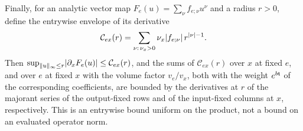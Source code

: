 \begin{lemma}
Finally, for an analytic vector map $F_e(u)=\sum_\nu f_{e;\nu}u^\nu$ and a radius $r>0$, define the entrywise envelope of its derivative
\begin{equation}\label{ch10:eq:derivative-envelope}
 \mathcal C_{ex}(r)=\sum_{\nu:\,\nu_x>0}\nu_x\lvert f_{e;\nu}\rvert\,r^{\lvert \nu\rvert-1}.
\end{equation}
Then $\sup_{\lVert u\rVert_\infty\le r}\lvert \partial_xF_e(u)\rvert\le\mathcal C_{ex}(r)$, and the sums of $\mathcal C_{ex}(r)$ over $x$ at fixed $e$, and over $e$ at fixed $x$ with the volume factor $v_e/v_x$, both with the weight $e^{b\mathsf t}$ of the corresponding coefficients, are bounded by the derivatives at $r$ of the majorant series of the output-fixed rows and of the input-fixed columns at $x$, respectively. This is an entrywise bound uniform on the product, not a bound on an evaluated operator norm.
\end{lemma}

